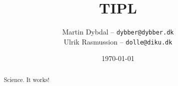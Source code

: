 \documentclass[10pt,a4paper,final,oneside,openany,article]{memoir}
\title{\vspace{-1.5cm}
TIPL
}
\author{
  Martin Dybdal -- \texttt{dybber@dybber.dk}
\\
Ulrik Rasmussion -- \texttt{dolle@diku.dk}}
\date{\today}
\begin{document}
\maketitle
\begin{abstract}
  Science. It works!
\end{abstract}

\printbibliography
\end{document}
